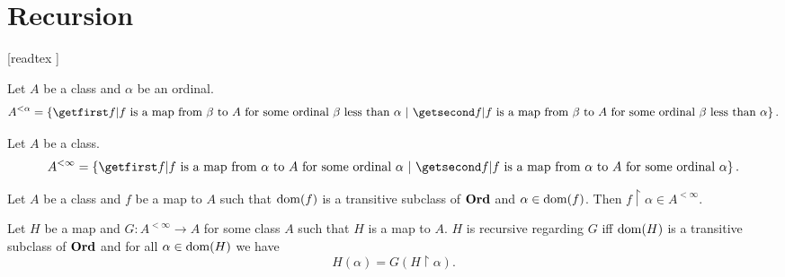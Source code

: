 \documentclass[../../set-theory/set-theory.tex]{subfiles}
\begin{document}
  \chapter{Recursion}


  \begin{forthel}

    [readtex ]

  \end{forthel}


  \begin{forthel}
    \begin{definition}
      Let $A$ be a class and $\alpha$ be an ordinal.
      \[ A^{< \alpha} = \class{f | \text{$f$ is a map from $\beta$ to $A$
      for some ordinal $\beta$ less than $\alpha$}}. \]
    \end{definition}
  \end{forthel}

  \begin{forthel}
    \begin{definition}
      Let $A$ be a class.
      \[ A^{< \infty} = \class{f | \text{$f$ is a map from $\alpha$ to $A$
      for some ordinal $\alpha$}}. \]
    \end{definition}
  \end{forthel}

  \begin{forthel}
    \begin{lemma}
      Let $A$ be a class and $f$ be a map to $A$ such that $\operatorname{dom}(f)$ is a
      transitive subclass of $\mathbf{Ord}$ and $\alpha \in \operatorname{dom}(f)$.
      Then $f \restriction \alpha \in A^{< \infty}$.
    \end{lemma}
  \end{forthel}

  \begin{forthel}
    \begin{definition}
      Let $H$ be a map and $G : A^{< \infty} \to A$ for some class $A$ such
      that $H$ is a map to $A$.
      $H$ is recursive regarding $G$ iff $\operatorname{dom}(H)$ is a transitive subclass of
      $\mathbf{Ord}$ and for all $\alpha \in \operatorname{dom}(H)$ we have
      \[ H(\alpha) = G(H \restriction \alpha). \]
    \end{definition}
  \end{forthel}
\end{document}
